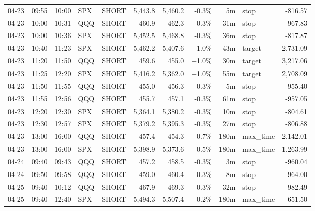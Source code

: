 \documentclass[11pt,a4paper,twoside]{article}
\begin{document}
\begin{center}
\begin{longtable}{>{\color{txtmain}}l l l l l r r r r >{\color{txtmain}}l r}
04-23 & 09:55 & 10:00 & SPX & SHORT & 5,443.8 & 5,460.2 & \textcolor{lossred}{-0.3\%} & 5m & stop & \textcolor{lossred}{-816.57} \\
04-23 & 10:00 & 10:31 & QQQ & SHORT & 460.9 & 462.3 & \textcolor{lossred}{-0.3\%} & 31m & stop & \textcolor{lossred}{-967.83} \\
04-23 & 10:00 & 10:36 & SPX & SHORT & 5,452.5 & 5,468.8 & \textcolor{lossred}{-0.3\%} & 36m & stop & \textcolor{lossred}{-817.87} \\
04-23 & 10:40 & 11:23 & SPX & SHORT & 5,462.2 & 5,407.6 & \textcolor{wingreen}{+1.0\%} & 43m & target & \textcolor{wingreen}{2,731.09} \\
04-23 & 11:20 & 11:50 & QQQ & SHORT & 459.6 & 455.0 & \textcolor{wingreen}{+1.0\%} & 30m & target & \textcolor{wingreen}{3,217.06} \\
04-23 & 11:25 & 12:20 & SPX & SHORT & 5,416.2 & 5,362.0 & \textcolor{wingreen}{+1.0\%} & 55m & target & \textcolor{wingreen}{2,708.09} \\
04-23 & 11:50 & 11:55 & QQQ & SHORT & 455.0 & 456.3 & \textcolor{lossred}{-0.3\%} & 5m & stop & \textcolor{lossred}{-955.40} \\
04-23 & 11:55 & 12:56 & QQQ & SHORT & 455.7 & 457.1 & \textcolor{lossred}{-0.3\%} & 61m & stop & \textcolor{lossred}{-957.05} \\
04-23 & 12:20 & 12:30 & SPX & SHORT & 5,364.1 & 5,380.2 & \textcolor{lossred}{-0.3\%} & 10m & stop & \textcolor{lossred}{-804.61} \\
04-23 & 12:30 & 12:57 & SPX & SHORT & 5,379.2 & 5,395.3 & \textcolor{lossred}{-0.3\%} & 27m & stop & \textcolor{lossred}{-806.88} \\
04-23 & 13:00 & 16:00 & QQQ & SHORT & 457.4 & 454.3 & \textcolor{wingreen}{+0.7\%} & 180m & max\_time & \textcolor{wingreen}{2,142.01} \\
04-23 & 13:00 & 16:00 & SPX & SHORT & 5,398.9 & 5,373.6 & \textcolor{wingreen}{+0.5\%} & 180m & max\_time & \textcolor{wingreen}{1,263.99} \\
04-24 & 09:40 & 09:43 & QQQ & SHORT & 457.2 & 458.5 & \textcolor{lossred}{-0.3\%} & 3m & stop & \textcolor{lossred}{-960.04} \\
04-24 & 09:50 & 09:58 & QQQ & SHORT & 459.0 & 460.4 & \textcolor{lossred}{-0.3\%} & 8m & stop & \textcolor{lossred}{-964.00} \\
04-25 & 09:40 & 10:12 & QQQ & SHORT & 467.9 & 469.3 & \textcolor{lossred}{-0.3\%} & 32m & stop & \textcolor{lossred}{-982.49} \\
04-25 & 09:40 & 12:40 & SPX & SHORT & 5,494.3 & 5,507.4 & \textcolor{lossred}{-0.2\%} & 180m & max\_time & \textcolor{lossred}{-651.50} \\

\end{longtable}
\end{center}
\end{document}
